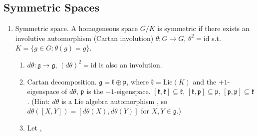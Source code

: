 \subsection{Symmetric Spaces}
\begin{enumerate}
    \item Symmetric space. A homogeneous space $G/K$ is symmetric if there exists an involutive automorphism (Cartan involution) $\theta: G\to G$, $\theta^2=\mathrm{id}$ s.t. $K = \{g \in G: \theta(g)=g\}$. 
        \begin{enumerate}
            \item $d\theta: \mathfrak{g} \to \mathfrak{g}$, $(d\theta)^2=\mathrm{id}$ is also an involution.
            \item Cartan decomposition. $\mathfrak{g}=\mathfrak{k} \oplus \mathfrak{p}$, where $\mathfrak{k} = \text{Lie}(K)$ and the $+1$-eigenspace of $d\theta$, $\mathfrak{p}$ is the $-1$-eigenspace. $[\mathfrak{k},\mathfrak{k}]\subseteq \mathfrak{k}$, $[\mathfrak{k},\mathfrak{p}]\subseteq \mathfrak{p}$, $[\mathfrak{p},\mathfrak{p}] \subseteq\mathfrak{k}$. (Hint: $d\theta$ is a Lie algebra automorphism \cite[Theorem~3.28]{Hall_2015_lie}, so $d\theta([X,Y])=[d\theta(X),d\theta(Y)]$ for $X,Y\in\mathfrak{g}$.)
            \item Let , 
        \end{enumerate}
\end{enumerate}

